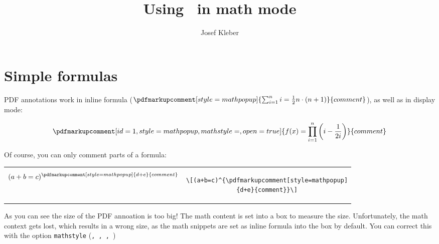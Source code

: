 \documentclass[pagesize,11pt,leqno]{scrartcl}
\begin{document}
\setlength{\parindent}{0pt}
\author{Josef Kleber}
\title{Using \texttt{\string\pdfmarkupcomment}\ in math mode}
%
\maketitle
\section{Simple formulas}
PDF annotations work in inline formula ($\pdfmarkupcomment[style=mathpopup]{\sum_{i=1}^{n}i=\frac{1}{2}n\cdot(n+1)}{comment}$), as well as in display mode:

\[\pdfmarkupcomment[id=1,style=mathpopup,mathstyle=\displaystyle,open=true]{f(x)=\prod_{i=1}^{n}\left(i-\frac{1}{2i}\right)}{comment}\]

\bigskip
Of course, you can only comment parts of a formula:

\bigskip
\begin{tabular}{cc}
\begin{minipage}{0.26\linewidth}
\[(a+b=c)^{\pdfmarkupcomment[style=mathpopup]{d+e}{comment}}\]
\end{minipage} &
\begin{minipage}{0.68\linewidth}
\begin{lstlisting}
\[(a+b=c)^{\pdfmarkupcomment[style=mathpopup]
{d+e}{comment}}\]
\end{lstlisting}
\end{minipage}
\end{tabular}

\bigskip
As you can see the size of the PDF annoation is too big! The math content is set into a box to measure the size. Unfortunately, the math context gets lost, which results in a wrong size, as the math snippets are set as inline formula into the box by default. You can correct this with the option \texttt{mathstyle} (\texttt{\string\textstyle, \string\displaystyle, \string\scriptstyle, \string\scriptscriptstyle}) 
\end{document}
